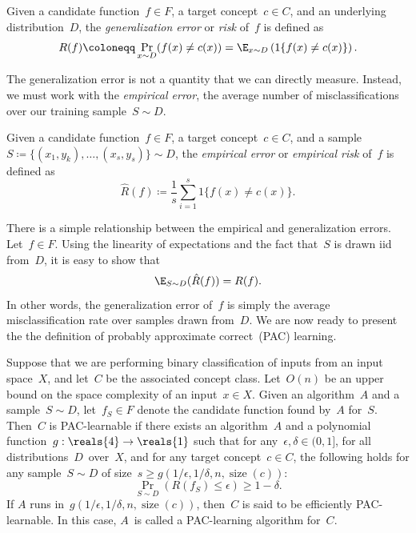 \documentclass[11pt,a4paper]{article}
\numberwithin{equation}{section}
\newcommand{\ind}[1]{1\{#1\}}
\newcommand{\size}{\operatorname{size}}
\begin{document}
\begin{definition}
Given a candidate function~$f \in F$, a target concept~$c \in C$, and an
underlying distribution~$D$, the \emph{generalization error} or \emph{risk}
of~$f$ is defined as
\[
	R(f) \coloneqq \Pr_{x \sim D}(f(x) \neq c(x)) =
		\E_{x \sim D} \left(\ind{f(x) \neq c(x)}\right).
\]
\end{definition}

The generalization error is not a quantity that we can directly measure.
Instead, we must work with the \emph{empirical error}, the average number of
misclassifications over our training sample~$S \sim D$.

\begin{definition}
Given a candidate function~$f \in F$, a target concept~$c \in C$, and a
sample~$S \coloneqq \{(x_1, y_k), \ldots, (x_s, y_s)\} \sim D$, the
\emph{empirical error} or \emph{empirical risk} of~$f$ is defined as
\[
	\hat{R}(f) \coloneqq \frac{1}{s} \sum_{i = 1}^s \ind{f(x) \neq c(x)}.
\]
\end{definition}

There is a simple relationship between the empirical and generalization errors.
Let~$f \in F$. Using the linearity of expectations and the fact that~$S$ is
drawn iid from~$D$, it is easy to show that
\[
	\E_{S \sim D} (\hat{R}(f)) = R(f).
\]
In other words, the generalization error of~$f$ is simply the average
misclassification rate over samples drawn from~$D$. We are now ready to present
the the definition of probably approximate correct~(PAC) learning.

\begin{definition}
Suppose that we are performing binary classification of inputs from an input
space~$X$, and let~$C$ be the associated concept class. Let~$O(n)$ be an upper
bound on the space complexity of an input~$x \in X$. Given an algorithm~$A$ and
a sample~$S \sim D$, let~$f_S \in F$ denote the candidate function found by~$A$
for~$S$. Then~$C$ is PAC-learnable if there exists an algorithm~$A$ and a
polynomial function~$g : \reals{4} \to \reals{1}$ such that for any~$\epsilon,
\delta \in (0, 1]$, for all distributions~$D$~over~$X$, and for any target
concept~$c \in C$, the following holds for any sample~$S \sim D$ of size~$s \geq
g(1/\epsilon, 1/\delta, n, \size(c))$:
\[
	\Pr_{S \sim D} (R(f_S) \leq \epsilon) \geq 1 - \delta.
\]
If $A$ runs in~$g(1/\epsilon, 1/\delta, n, \size(c))$, then~$C$ is said to be
efficiently PAC-learnable. In this case, $A$~is called a PAC-learning algorithm
for~$C$.
\end{definition}
\end{document}
